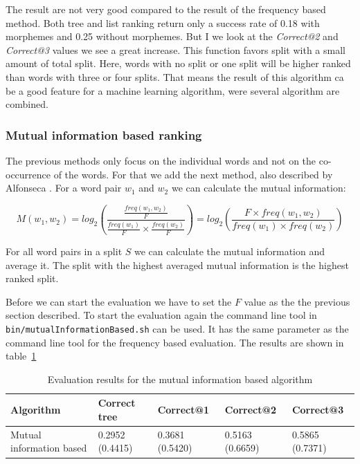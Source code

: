 \documentclass[11pt, accentcolor=tud9b, nochapname]{tudreport}
\begin{document}
The result are not very good compared to the result of the frequency based method. Both tree and list ranking return only a success rate of 0.18 with morphemes and 0.25 without morphemes. But I we look at the \emph{Correct@2} and \emph{Correct@3} values we see a great increase. This function favors split with a small amount of total split. Here, words with no split or one split will be higher ranked than words with three or four splits. That means the result of this algorithm ca be a good feature for a machine learning algorithm, were several algorithm are combined. 

\subsubsection{Mutual information based ranking}
The previous methods only focus on the individual words and not on the co-occurrence of the words. For that we add the next method, also described by Alfonseca \cite{alf2008}. For a word pair $w_1$ and $w_2$ we can calculate the mutual information:

\begin{equation}
  M(w_1, w_2) = log_2(\frac{\frac{freq(w_1, w_2)}{F}}
    {\frac{freq(w_1)}{F} \times \frac{freq(w_2)}{F}})
    = log_2(\frac{F \times freq(w_1, w_2)}{freq(w_1) \times freq(w_2)})
\end{equation}

For all word pairs in a split $S$ we can calculate the mutual information and average it. The split with the highest averaged mutual information is the highest ranked split.

Before we can start the evaluation we have to set the $F$ value as the the previous section described. To start the evaluation again the command line tool in \texttt{bin/mutualInformationBased.sh} can be used. It has the same parameter as the command line tool for the frequency based evaluation. The results are shown in table~\ref{eval_mutual}

\begin{table}[h]
  \begin{center}
    \begin{tabular}{|l|l||l|l|l|}
      \hline
      \textbf{Algorithm} & \textbf{Correct tree} & \textbf{Correct@1} & \textbf{Correct@2} & \textbf{Correct@3} \\ \hline
      Mutual information based & 0.2952 (0.4415) & 0.3681 (0.5420) & 0.5163 (0.6659) & 0.5865 (0.7371) \\ \hline
    \end{tabular}
  \end{center}
  \caption{Evaluation results for the mutual information based algorithm}
  \label{eval_mutual}
\end{table}
\end{document}
